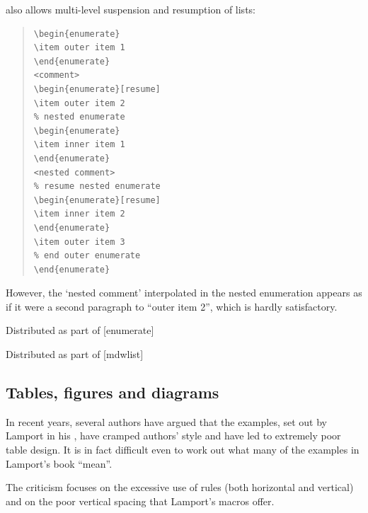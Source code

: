 also allows multi-level suspension and resumption
of lists:
\begin{quote}
\begin{verbatim}
\begin{enumerate}
\item outer item 1
\end{enumerate}
<comment>
\begin{enumerate}[resume]
\item outer item 2
% nested enumerate
\begin{enumerate}
\item inner item 1
\end{enumerate}
<nested comment>
% resume nested enumerate
\begin{enumerate}[resume]
\item inner item 2
\end{enumerate}
\item outer item 3
% end outer enumerate
\end{enumerate}
\end{verbatim}
\end{quote}
However, the `nested comment' interpolated in the nested enumeration
appears as if it were a second paragraph to ``outer item 2'', which is
hardly satisfactory.
\begin{ctanrefs}
\item[enumerate.sty]Distributed as part of [enumerate]
\item[enumitem.sty]
\item[expdlist.sty]
\item[mdwlist.sty]Distributed as part of [mdwlist]
\end{ctanrefs}

\subsection{Tables, figures and diagrams}


In recent years, several authors have argued that the examples, set
out by Lamport in his , have cramped
authors' style and have led to extremely poor table design.  It is in
fact difficult even to work out what many of the examples in Lamport's
book ``mean''.

The criticism focuses on the excessive use of rules (both horizontal
and vertical) and on the poor vertical spacing that Lamport's macros
offer.

